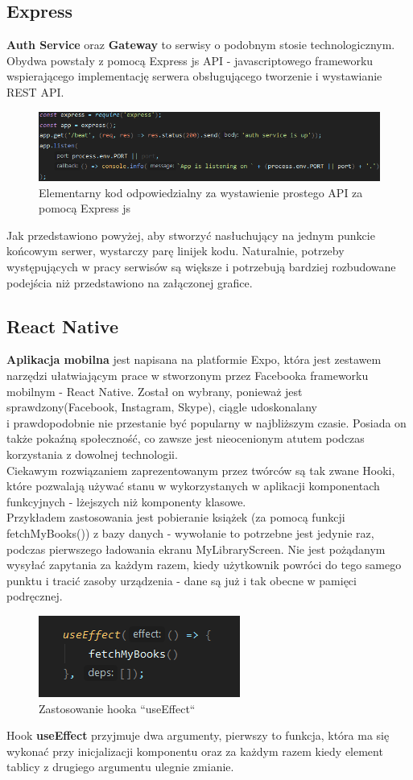 \subsection{Express}
\textbf{Auth Service} oraz \textbf{Gateway} to serwisy o podobnym stosie technologicznym. Obydwa powstały z pomocą Express js API - javascriptowego frameworku wspierającego implementację serwera obsługującego tworzenie i wystawianie REST API.
\begin{figure}[H]
	\centering
	\includegraphics[width=\linewidth]{express_simple.png}
	\caption{Elementarny kod odpowiedzialny za wystawienie prostego API za pomocą Express js}
\end{figure}
Jak przedstawiono powyżej, aby stworzyć nasłuchujący na jednym punkcie końcowym serwer, wystarczy parę linijek kodu. Naturalnie, potrzeby występujących w pracy serwisów są większe i potrzebują bardziej rozbudowane podejścia niż przedstawiono na załączonej grafice.

\subsection{React Native}
\textbf{Aplikacja mobilna} jest napisana na platformie Expo, która jest zestawem narzędzi ułatwiającym prace w stworzonym przez Facebooka frameworku mobilnym - React Native. Został on wybrany, ponieważ jest sprawdzony(Facebook, Instagram, Skype), ciągle udoskonalany\\ i prawdopodobnie nie przestanie być popularny w najbliższym czasie. Posiada on także pokaźną społeczność, co zawsze jest nieocenionym atutem podczas korzystania z dowolnej technologii.\\
Ciekawym rozwiązaniem zaprezentowanym przez twórców są tak zwane Hooki, które pozwalają używać stanu w wykorzystanych w aplikacji komponentach funkcyjnych - lżejszych niż komponenty klasowe.\\
Przykładem zastosowania jest pobieranie książek (za pomocą funkcji fetchMyBooks()) z bazy danych - wywołanie to potrzebne jest jedynie raz, podczas pierwszego ładowania ekranu MyLibraryScreen. Nie jest pożądanym wysyłać zapytania za każdym razem, kiedy użytkownik powróci do tego samego punktu i tracić zasoby urządzenia - dane są już i tak obecne w pamięci podręcznej. 
\begin{figure}[H]
	\centering
	\includegraphics{hook.png}
	\caption{Zastosowanie hooka ``useEffect``}
\end{figure}
Hook \textbf{useEffect} przyjmuje dwa argumenty, pierwszy to funkcja, która ma się wykonać przy inicjalizacji komponentu oraz za każdym razem kiedy element tablicy z drugiego argumentu ulegnie zmianie.

